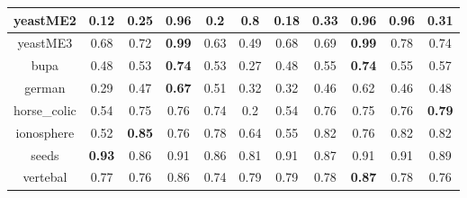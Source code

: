 \documentclass{article}%
\begin{document}
\begin{tabular}{c|cccccccccc}
\hline%
yeastME2&0.12&0.25&\textbf{0.96}&0.2&0.8&0.18&0.33&\textbf{0.96}&\textbf{0.96}&0.31\\%
\hline%
yeastME3&0.68&0.72&\textbf{0.99}&0.63&0.49&0.68&0.69&\textbf{0.99}&0.78&0.74\\%
\hline%
bupa&0.48&0.53&\textbf{0.74}&0.53&0.27&0.48&0.55&\textbf{0.74}&0.55&0.57\\%
\hline%
german&0.29&0.47&\textbf{0.67}&0.51&0.32&0.32&0.46&0.62&0.46&0.48\\%
\hline%
horse\_colic&0.54&0.75&0.76&0.74&0.2&0.54&0.76&0.75&0.76&\textbf{0.79}\\%
\hline%
ionosphere&0.52&\textbf{0.85}&0.76&0.78&0.64&0.55&0.82&0.76&0.82&0.82\\%
\hline%
seeds&\textbf{0.93}&0.86&0.91&0.86&0.81&0.91&0.87&0.91&0.91&0.89\\%
\hline%
vertebal&0.77&0.76&0.86&0.74&0.79&0.79&0.78&\textbf{0.87}&0.78&0.76\\%
\hline%
\end{tabular}

%
\end{document}
